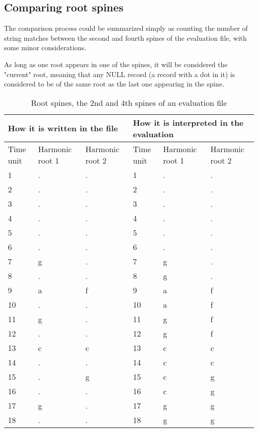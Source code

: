 	\subsection{Comparing root spines}
		The comparison process could be summarized simply as counting the number of string matches between the second and fourth spines of the evaluation file, with some minor considerations.

		As long as one root appears in one of the spines, it will be considered the "current" root, meaning that any NULL record (a record with a dot in it) is considered to be of the same root as the last one appearing in the spine.

		\begin{table}[]
		\centering
		\begin{tabular}{|lll|lll|}
		\hline
		\multicolumn{3}{|l|}{How it is written in the file} & \multicolumn{3}{l|}{How it is interpreted in the evaluation} \\ \hline
		\multicolumn{1}{|l|}{Time unit} & \multicolumn{1}{l|}{Harmonic root 1} & Harmonic root 2 & \multicolumn{1}{l|}{Time unit} & \multicolumn{1}{l|}{Harmonic root 1} & Harmonic root 2 \\ \hline
		1 & . & . & 1 & . & . \\
		2 & . & . & 2 & . & . \\
		3 & . & . & 3 & . & . \\
		4 & . & . & 4 & . & . \\
		5 & . & . & 5 & . & . \\
		6 & . & . & 6 & . & . \\
		7 & g & . & 7 & g & . \\
		8 & . & . & 8 & g & . \\
		9 & a & f & 9 & a & f \\
		10 & . & . & 10 & a & f \\
		11 & g & . & 11 & g & f \\
		12 & . & . & 12 & g & f \\
		13 & c & c & 13 & c & c \\
		14 & . & . & 14 & c & c \\
		15 & . & g & 15 & c & g \\
		16 & . & . & 16 & c & g \\
		17 & g & . & 17 & g & g \\
		18 & . & . & 18 & g & g \\ \hline
		\end{tabular}
		\caption{Root spines, the 2nd and 4th spines of an evaluation file}
		\label{table:roots}
		\end{table}

